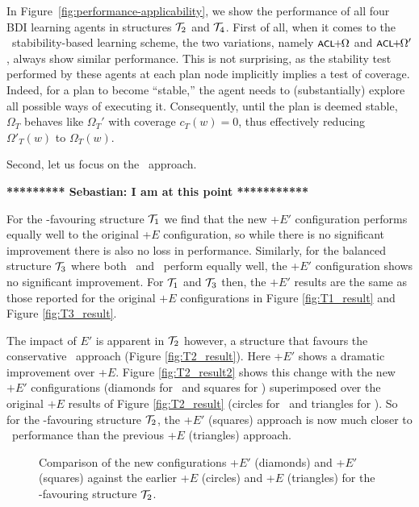 In Figure~\ref{fig:performance-applicability}, we show the performance of all
four BDI learning agents in structures $\T_2$ and $\T_4$.
First of all, when it comes to the \BUL\ stabibility-based learning scheme, the
two variations, namely $\BULSELA$ and $\BULSELB$, always show similar
performance.
This is not surprising, as the stability test performed by these agents at each
plan node implicitly implies a test of coverage. Indeed, for a plan to become
``stable,'' the agent needs to (substantially) explore all possible  ways of
executing it. Consequently,  until the plan is deemed stable, $\Omega_T$ behaves
like $\Omega_T'$ with coverage $c_T(w)=0$, thus effectively reducing
$\Omega'_T(w)$ to $\Omega_T(w)$.



Second, let us focus on the \CL\ approach.

\textbf{********* Sebastian: I am at this point ***********}


For the \CL-favouring structure ${\mathcal{T}}_1$ we find that the new \CL+$E'$
configuration performs equally well to the original \CL+$E$
configuration, so while there is no significant improvement there is
also no loss in performance. Similarly, for the balanced structure
${\mathcal{T}}_3$ where both \CL\ and \BUL\ perform equally well, the \CL+$E'$
configuration shows no significant improvement. For ${\mathcal{T}}_1$ and ${\mathcal{T}}_3$
then, the $+E'$ results are the same as those reported for the
original $+E$ configurations in Figure \ref{fig:T1_result} and Figure
\ref{fig:T3_result}. 

The impact of $E'$ is apparent in $\T_2$ however, a structure that
favours the conservative \BUL\ approach (Figure
\ref{fig:T2_result}). Here \CL+$E'$ shows a dramatic improvement over
\CL+$E$. Figure \ref{fig:T2_result2} shows this change with the new
$+E'$ configurations (diamonds for \BUL\ and squares for \CL)
superimposed over the original $+E$ results of Figure
\ref{fig:T2_result} (circles for \BUL\ and triangles for \CL). So for
the \BUL-favouring structure $\T_2$, the \CL+$E'$ (squares) approach
is now much closer to \BUL\ performance than the previous \CL+$E$
(triangles) approach. 


\begin{figure*}[t]
\begin{center}
\subfigure[Structure $\T_2$]{\label{fig:T2_result2}

}
\qquad
\subfigure[Structure $\T_4$]{\label{fig:T4_result}

}

\caption{Comparison of the new configurations \BUL+$E'$ (diamonds) and \CL+$E'$
(squares) against the earlier \BUL+$E$ (circles) and \CL+$E$ (triangles) for the
\BUL-favouring structure $\T_2$.}
\end{center}
\end{figure*}


